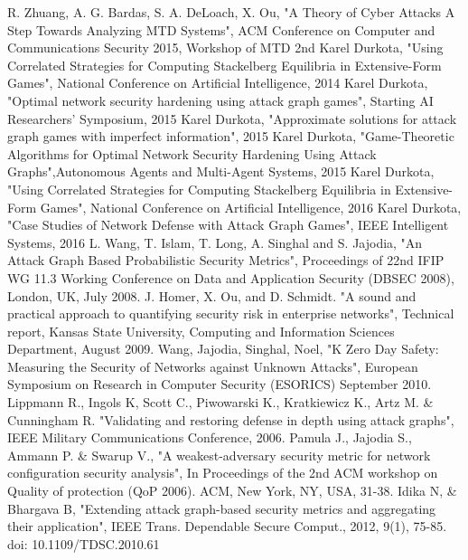 \documentclass[12pt,a4paper]{article}
\begin{document}
\begin{thebibliography}{}
 R. Zhuang, A. G. Bardas, S. A. DeLoach, X. Ou, "A Theory of Cyber Attacks A Step Towards Analyzing MTD Systems", ACM Conference on Computer and Communications Security 2015, Workshop of MTD 2nd
 Karel Durkota, "Using Correlated Strategies for Computing Stackelberg Equilibria in Extensive-Form Games", National Conference on Artificial Intelligence, 2014
 Karel Durkota, "Optimal network security hardening using attack graph games", Starting AI Researchers' Symposium, 2015
 Karel Durkota, "Approximate solutions for attack graph games with imperfect information", 2015
 Karel Durkota, "Game-Theoretic Algorithms for Optimal Network Security Hardening Using Attack Graphs",Autonomous Agents and Multi-Agent Systems, 2015
 Karel Durkota, "Using Correlated Strategies for Computing Stackelberg Equilibria in Extensive-Form Games", National Conference on Artificial Intelligence, 2016
 Karel Durkota, "Case Studies of Network Defense with Attack Graph Games", IEEE Intelligent Systems, 2016
 L. Wang, T. Islam, T. Long, A. Singhal and S. Jajodia, "An Attack Graph Based Probabilistic Security Metrics", Proceedings of 22nd IFIP WG 11.3 Working Conference on Data and Application Security (DBSEC 2008), London, UK, July 2008.
 J. Homer, X. Ou, and D. Schmidt. "A sound and practical approach to quantifying security risk in enterprise networks", Technical report, Kansas State University, Computing and Information Sciences Department, August 2009.
 Wang, Jajodia, Singhal, Noel, "K Zero Day Safety: Measuring the Security of Networks against Unknown Attacks", European Symposium on Research in Computer Security (ESORICS) September 2010.
 Lippmann R., Ingols K, Scott C., Piwowarski K., Kratkiewicz K., Artz M. \& Cunningham R. "Validating and restoring defense in depth using attack graphs", IEEE Military Communications Conference, 2006.
 Pamula J., Jajodia S., Ammann P. \& Swarup V., "A weakest-adversary security metric for network configuration security analysis", In Proceedings of the 2nd
ACM workshop on Quality of protection (QoP 2006). ACM, New York, NY, USA, 31-38. 
 Idika N, \& Bhargava B, "Extending attack graph-based security metrics and aggregating their application", IEEE Trans. Dependable Secure Comput., 2012, 9(1), 75-85. doi: 10.1109/TDSC.2010.61

\end{thebibliography}
\end{document}
